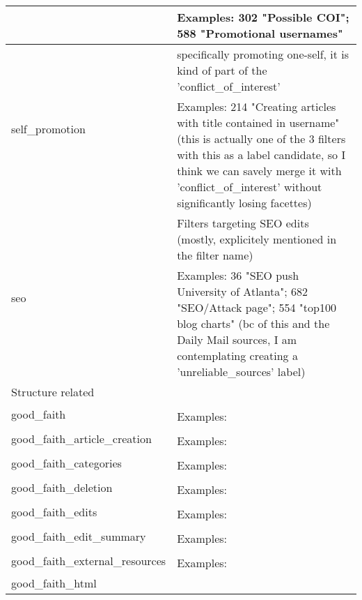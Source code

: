 \begin{longtable}{ | p{5cm} | p{9cm} | }
                                     & Examples: 302 "Possible COI"; 588 "Promotional usernames"\\
    \hline
    \multirow{2}{*}{self\_promotion} & specifically promoting one-self, it is kind of part of the 'conflict\_of\_interest'\\
                                     & Examples: 214 "Creating articles with title contained in username" (this is actually one of the 3 filters with this as a label candidate, so I think we can savely merge it with 'conflict\_of\_interest' without significantly losing facettes)\\
    \hline
    \multirow{2}{*}{seo} & Filters targeting SEO edits (mostly, explicitely mentioned in the filter name)\\
                                     & Examples: 36 "SEO push University of Atlanta"; 682 "SEO/Attack page"; 554 "top100 blog charts" (bc of this and the Daily Mail sources, I am contemplating creating a 'unreliable\_sources' label)\\
    \hline \hline
        \multicolumn{2}{|l|}{Structure related} \\
    \hline
    \multirow{2}{*}{good\_faith} & \\
                                     & Examples:\\
    \hline
    \multirow{2}{*}{good\_faith\_article\_creation} & \\
                                     & Examples:\\
    \hline
    \multirow{2}{*}{good\_faith\_categories} & \\
                                     & Examples:\\
    \hline
    \multirow{2}{*}{good\_faith\_deletion} & \\
                                     & Examples:\\
    \hline
    \multirow{2}{*}{good\_faith\_edits} & \\
                                     & Examples:\\
    \hline
    \multirow{2}{*}{good\_faith\_edit\_summary} & \\
                                     & Examples:\\
    \hline
    \multirow{2}{*}{good\_faith\_external\_resources} & \\
                                     & Examples:\\
    \hline
    \multirow{2}{*}{good\_faith\_html} & \\

\end{longtable}
